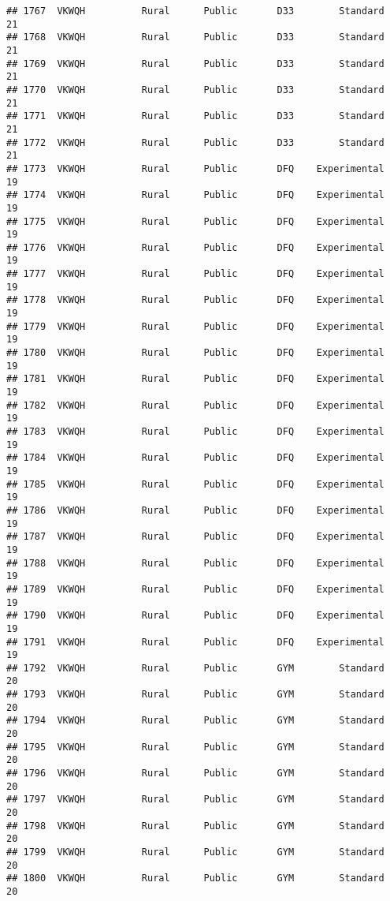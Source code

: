 \documentclass[
]{article}
\begin{document}
\begin{verbatim}
## 1767  VKWQH          Rural      Public       D33        Standard        21
## 1768  VKWQH          Rural      Public       D33        Standard        21
## 1769  VKWQH          Rural      Public       D33        Standard        21
## 1770  VKWQH          Rural      Public       D33        Standard        21
## 1771  VKWQH          Rural      Public       D33        Standard        21
## 1772  VKWQH          Rural      Public       D33        Standard        21
## 1773  VKWQH          Rural      Public       DFQ    Experimental        19
## 1774  VKWQH          Rural      Public       DFQ    Experimental        19
## 1775  VKWQH          Rural      Public       DFQ    Experimental        19
## 1776  VKWQH          Rural      Public       DFQ    Experimental        19
## 1777  VKWQH          Rural      Public       DFQ    Experimental        19
## 1778  VKWQH          Rural      Public       DFQ    Experimental        19
## 1779  VKWQH          Rural      Public       DFQ    Experimental        19
## 1780  VKWQH          Rural      Public       DFQ    Experimental        19
## 1781  VKWQH          Rural      Public       DFQ    Experimental        19
## 1782  VKWQH          Rural      Public       DFQ    Experimental        19
## 1783  VKWQH          Rural      Public       DFQ    Experimental        19
## 1784  VKWQH          Rural      Public       DFQ    Experimental        19
## 1785  VKWQH          Rural      Public       DFQ    Experimental        19
## 1786  VKWQH          Rural      Public       DFQ    Experimental        19
## 1787  VKWQH          Rural      Public       DFQ    Experimental        19
## 1788  VKWQH          Rural      Public       DFQ    Experimental        19
## 1789  VKWQH          Rural      Public       DFQ    Experimental        19
## 1790  VKWQH          Rural      Public       DFQ    Experimental        19
## 1791  VKWQH          Rural      Public       DFQ    Experimental        19
## 1792  VKWQH          Rural      Public       GYM        Standard        20
## 1793  VKWQH          Rural      Public       GYM        Standard        20
## 1794  VKWQH          Rural      Public       GYM        Standard        20
## 1795  VKWQH          Rural      Public       GYM        Standard        20
## 1796  VKWQH          Rural      Public       GYM        Standard        20
## 1797  VKWQH          Rural      Public       GYM        Standard        20
## 1798  VKWQH          Rural      Public       GYM        Standard        20
## 1799  VKWQH          Rural      Public       GYM        Standard        20
## 1800  VKWQH          Rural      Public       GYM        Standard        20

\end{verbatim}
\end{document}
